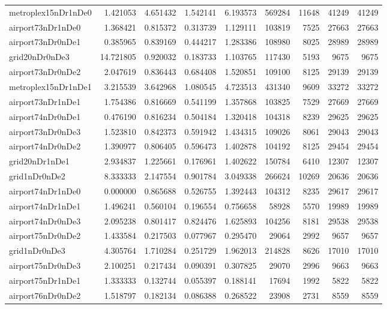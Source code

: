 \documentclass[../../../thesis.tex]{subfiles}
\begin{document}
\begin{longtable}{|l|r|r|r|r|r|r|r|r|}
metroplex15nDr1nDe0 & 1.421053 & 4.651432 & 1.542141 & 6.193573 & 569284 & 11648 & 41249 & 41249 \\
airport73nDr1nDe0 & 1.368421 & 0.815372 & 0.313739 & 1.129111 & 103819 & 7525 & 27663 & 27663 \\
airport73nDr0nDe1 & 0.385965 & 0.839169 & 0.444217 & 1.283386 & 108980 & 8025 & 28989 & 28989 \\
grid20nDr0nDe3 & 14.721805 & 0.920032 & 0.183733 & 1.103765 & 117430 & 5193 & 9675 & 9675 \\
airport73nDr0nDe2 & 2.047619 & 0.836443 & 0.684408 & 1.520851 & 109100 & 8125 & 29139 & 29139 \\
metroplex15nDr1nDe1 & 3.215539 & 3.642968 & 1.080545 & 4.723513 & 431340 & 9609 & 33272 & 33272 \\
airport73nDr1nDe1 & 1.754386 & 0.816669 & 0.541199 & 1.357868 & 103825 & 7529 & 27669 & 27669 \\
airport74nDr0nDe1 & 0.476190 & 0.816234 & 0.504184 & 1.320418 & 104318 & 8239 & 29625 & 29625 \\
airport73nDr0nDe3 & 1.523810 & 0.842373 & 0.591942 & 1.434315 & 109026 & 8061 & 29043 & 29043 \\
airport74nDr0nDe2 & 1.390977 & 0.806405 & 0.596473 & 1.402878 & 104192 & 8125 & 29454 & 29454 \\
grid20nDr1nDe1 & 2.934837 & 1.225661 & 0.176961 & 1.402622 & 150784 & 6410 & 12307 & 12307 \\
grid1nDr0nDe2 & 8.333333 & 2.147554 & 0.901784 & 3.049338 & 266624 & 10269 & 20636 & 20636 \\
airport74nDr1nDe0 & 0.000000 & 0.865688 & 0.526755 & 1.392443 & 104312 & 8235 & 29617 & 29617 \\
airport74nDr1nDe1 & 1.496241 & 0.560104 & 0.196554 & 0.756658 & 58928 & 5570 & 19989 & 19989 \\
airport74nDr0nDe3 & 2.095238 & 0.801417 & 0.824476 & 1.625893 & 104256 & 8181 & 29538 & 29538 \\
airport75nDr0nDe2 & 1.433584 & 0.217503 & 0.077967 & 0.295470 & 29064 & 2992 & 9657 & 9657 \\
grid1nDr0nDe3 & 4.305764 & 1.710284 & 0.251729 & 1.962013 & 214828 & 8626 & 17010 & 17010 \\
airport75nDr0nDe3 & 2.100251 & 0.217434 & 0.090391 & 0.307825 & 29070 & 2996 & 9663 & 9663 \\
airport75nDr1nDe1 & 1.333333 & 0.132744 & 0.055397 & 0.188141 & 17694 & 1992 & 5822 & 5822 \\
airport76nDr0nDe2 & 1.518797 & 0.182134 & 0.086388 & 0.268522 & 23908 & 2731 & 8559 & 8559 \\

\end{longtable}
\end{document}

